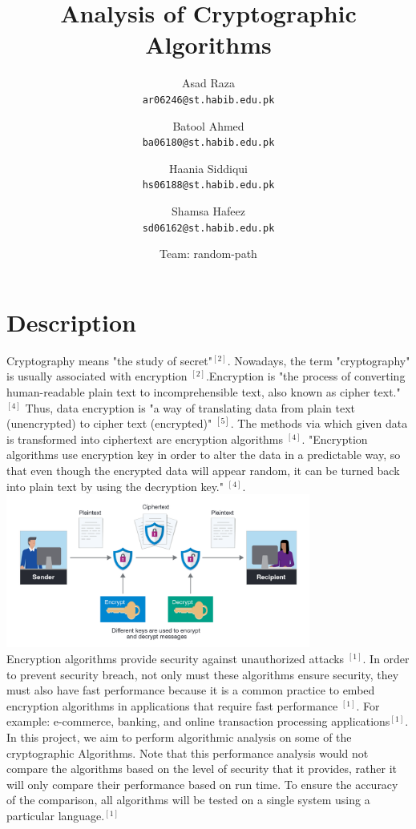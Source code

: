 \documentclass[a4paper]{article}
\title{Analysis of Cryptographic Algorithms}
\author{
  Asad Raza\\
  \texttt{ar06246@st.habib.edu.pk}
  \and
  Batool Ahmed\\
  \texttt{ba06180@st.habib.edu.pk}
  \and 
  Haania Siddiqui\\
  \texttt{hs06188@st.habib.edu.pk}
  \and
  Shamsa Hafeez\\
  \texttt{sd06162@st.habib.edu.pk}
  \and 
  Team: random-path \\
}
\begin{document}
\section{Description} %

Cryptography means "the study of secret"$^{[2]}$. Nowadays, the term "cryptography" is usually associated with encryption $^{[2]}$.Encryption is "the process of converting human-readable plain text to incomprehensible text, also known as cipher text." $^{[4]}$ Thus, data encryption is "a way of translating data from plain text (unencrypted) to cipher text (encrypted)" $^{[5]}$. The methods via which given data is transformed into ciphertext are encryption algorithms $^{[4]}$. "Encryption algorithms use encryption key in order to alter the data in a predictable way, so that even though the encrypted data will appear random, it can be turned back into plain text by using the decryption key." $^{[4]}$. \\
\includegraphics[width=10cm]{images/what-is-encryption.png}\\
Encryption algorithms provide security against unauthorized attacks $^{[1]}$. In order to prevent security breach, not only must these algorithms ensure security, they must also have fast performance because it is a common practice to embed encryption algorithms in applications that require fast performance $^{[1]}$. For example: e-commerce, banking, and online transaction processing applications$^{[1]}$. \\

In this project, we aim to perform algorithmic analysis on some of the cryptographic Algorithms. Note that this performance analysis would not compare the algorithms based on the level of security that it provides, rather it will only compare their performance based on run time. To ensure the accuracy of the comparison, all algorithms will be tested on a single system using a particular language.$^{[1]}$
\end{document}
